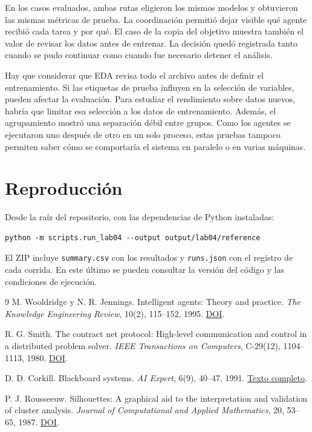 \documentclass[11pt]{article}
\begin{document}
En los casos evaluados, ambas rutas eligieron los mismos modelos y obtuvieron las mismas métricas de prueba. La coordinación permitió dejar visible qué agente recibió cada tarea y por qué. El caso de la copia del objetivo muestra también el valor de revisar los datos antes de entrenar. La decisión quedó registrada tanto cuando se pudo continuar como cuando fue necesario detener el análisis.

Hay que considerar que EDA revisa todo el archivo antes de definir el entrenamiento. Si las etiquetas de prueba influyen en la selección de variables, pueden afectar la evaluación. Para estudiar el rendimiento sobre datos nuevos, habría que limitar esa selección a los datos de entrenamiento. Además, el agrupamiento mostró una separación débil entre grupos. Como los agentes se ejecutaron uno después de otro en un solo proceso, estas pruebas tampoco permiten saber cómo se comportaría el sistema en paralelo o en varias máquinas.

\clearpage
\appendix
\section{Reproducción}

Desde la raíz del repositorio, con las dependencias de Python instaladas:
\begin{verbatim}
python -m scripts.run_lab04 --output output/lab04/reference
\end{verbatim}
El ZIP incluye \texttt{summary.csv} con los resultados y \texttt{runs.json} con el registro de cada corrida. En este último se pueden consultar la versión del código y las condiciones de ejecución.

\begin{thebibliography}{9}
M. Wooldridge y N. R. Jennings.
Intelligent agents: Theory and practice.
\textit{The Knowledge Engineering Review}, 10(2), 115--152, 1995.
\href{https://doi.org/10.1017/S0269888900008122}{DOI}.

R. G. Smith.
The contract net protocol: High-level communication and control in a distributed problem solver.
\textit{IEEE Transactions on Computers}, C-29(12), 1104--1113, 1980.
\href{https://doi.org/10.1109/TC.1980.1675516}{DOI}.

D. D. Corkill.
Blackboard systems.
\textit{AI Expert}, 6(9), 40--47, 1991.
\href{https://mas.cs.umass.edu/Documents/Corkill/ai-expert.pdf}{Texto completo}.

P. J. Rousseeuw.
Silhouettes: A graphical aid to the interpretation and validation of cluster analysis.
\textit{Journal of Computational and Applied Mathematics}, 20, 53--65, 1987.
\href{https://doi.org/10.1016/0377-0427(87)90125-7}{DOI}.
\end{thebibliography}
\end{document}
